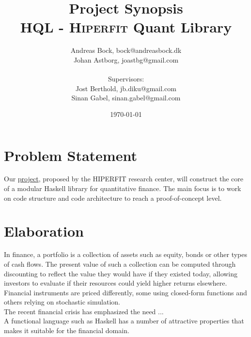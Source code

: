\documentclass[11pt]{article}
\makeatletter
\def\Author{Andreas Bock, bock@andreasbock.dk\\
Johan Astborg, joastbg@gmail.com\\\\
Supervisors:\\
Jost Berthold, jb.diku@gmail.com\\
Sinan Gabel, sinan.gabel@gmail.com
}
\def\Title{\bf Project Synopsis\\ HQL - \textsc{Hiperfit} Quant Library}
\makeatother
\begin{document}
\title{\Title}
\author{\Author}
\date{\today}
\maketitle

\begin{abstract}


\end{abstract}

\section*{Problem Statement}

Our \href{http://hiperfit.dk/studentproject_haskell_library_finance.html}{project}, proposed by the HIPERFIT research center, will construct the core
of a modular Haskell library for quantitative finance.
The main focus is to work on code structure and code architecture to reach a proof-of-concept level.

\section*{Elaboration}

In finance, a portfolio is a collection of assets such as equity, bonds or other
types of cash flows. The present value of such a collection can be computed through
discounting to reflect the value they would have if they existed today, allowing
investors to evaluate if their resources could yield higher returns elsewhere.
Financial instruments are priced differently, some using closed-form functions and
others relying on stochastic simulation.\\


The recent financial crisis has emphasized the need ...\\ %

A functional language such as Haskell has a number of attractive properties that
makes it suitable for the financial domain.\\ %

\end{document}
